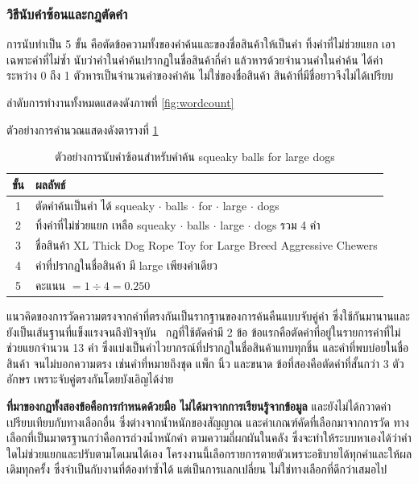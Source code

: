 
\subsubsection*{วิธีนับคำซ้อนและกฎตัดคำ}

การนับทำเป็น 5 ขั้น คือตัดข้อความทั้งของคำค้นและของชื่อสินค้าให้เป็นคำ
ทิ้งคำที่ไม่ช่วยแยก เอาเฉพาะคำที่ไม่ซ้ำ นับว่าคำในคำค้นปรากฏในชื่อสินค้ากี่คำ
แล้วหารด้วยจำนวนคำในคำค้น ได้ค่าระหว่าง 0 ถึง 1
ตัวหารเป็นจำนวนคำของคำค้น ไม่ใช่ของชื่อสินค้า สินค้าที่มีชื่อยาวจึงไม่ได้เปรียบ

ลำดับการทำงานทั้งหมดแสดงดังภาพที่ \ref{fig:wordcount}



ตัวอย่างการคำนวณแสดงดังตารางที่ \ref{tab:wordcount_example}

\begin{table}[H]
\centering
\caption{ตัวอย่างการนับคำซ้อนสำหรับคำค้น squeaky balls for large dogs}
\label{tab:wordcount_example}
\small
\begin{tabular}{|c|p{10.6cm}|}
\hline
\textbf{ขั้น} & \textbf{ผลลัพธ์} \\
\hline
1 & ตัดคำค้นเป็นคำ ได้ squeaky $\cdot$ balls $\cdot$ for $\cdot$ large $\cdot$ dogs \\ \hline
2 & ทิ้งคำที่ไม่ช่วยแยก เหลือ squeaky $\cdot$ balls $\cdot$ large $\cdot$ dogs รวม 4 คำ \\ \hline
3 & ชื่อสินค้า XL Thick Dog Rope Toy for Large Breed Aggressive Chewers \\ \hline
4 & คำที่ปรากฏในชื่อสินค้า มี large เพียงคำเดียว \\ \hline
5 & คะแนน $= 1 \div 4 = 0.250$ \\
\hline
\end{tabular}
\end{table}

แนวคิดของการวัดความตรงจากคำที่ตรงกันเป็นรากฐานของการค้นคืนแบบจับคู่คำ ซึ่งใช้กันมานานและยังเป็นเส้นฐานที่แข็งแรงจนถึงปัจจุบัน \cite{robertson2009bm25}\
กฎที่ใช้ตัดคำมี 2 ข้อ ข้อแรกคือตัดคำที่อยู่ในรายการคำที่ไม่ช่วยแยกจำนวน 13 คำ
ซึ่งแบ่งเป็นคำไวยากรณ์ที่ปรากฏในชื่อสินค้าแทบทุกชิ้น และคำที่พบบ่อยในชื่อสินค้า
จนไม่บอกความตรง เช่นคำที่หมายถึงชุด แพ็ก นิ้ว และขนาด
ข้อที่สองคือตัดคำที่สั้นกว่า 3 ตัวอักษร เพราะจับคู่ตรงกันโดยบังเอิญได้ง่าย

\textbf{ที่มาของกฎทั้งสองข้อคือการกำหนดด้วยมือ ไม่ได้มาจากการเรียนรู้จากข้อมูล}
และยังไม่ได้กวาดค่าเปรียบเทียบกับทางเลือกอื่น ซึ่งต่างจากน้ำหนักของสัญญาณ
และค่าเกณฑ์คัดที่เลือกมาจากการวัด ทางเลือกที่เป็นมาตรฐานกว่าคือการถ่วงน้ำหนักคำ
ตามความถี่ผกผันในคลัง ซึ่งจะทำให้ระบบหาเองได้ว่าคำใดไม่ช่วยแยกและปรับตามโดเมนได้เอง
โครงงานนี้เลือกรายการตายตัวเพราะอธิบายได้ทุกคำและให้ผลเดิมทุกครั้ง
ซึ่งจำเป็นกับงานที่ต้องทำซ้ำได้ แต่เป็นการแลกเปลี่ยน ไม่ใช่ทางเลือกที่ดีกว่าเสมอไป

